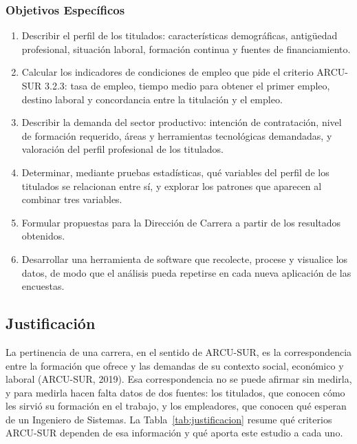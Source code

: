 \documentclass[12pt, a4paper]{article}
\begin{document}
\subsubsection{Objetivos Específicos}

\begin{enumerate}
  \item Describir el perfil de los titulados: características
  demográficas, antigüedad profesional, situación laboral, formación
  continua y fuentes de financiamiento.
  \item Calcular los indicadores de condiciones de empleo que pide el
  criterio ARCU-SUR 3.2.3: tasa de empleo, tiempo medio para obtener el
  primer empleo, destino laboral y concordancia entre la titulación y el
  empleo.
  \item Describir la demanda del sector productivo: intención de
  contratación, nivel de formación requerido, áreas y herramientas
  tecnológicas demandadas, y valoración del perfil profesional de los
  titulados.
  \item Determinar, mediante pruebas estadísticas, qué variables del
  perfil de los titulados se relacionan entre sí, y explorar los
  patrones que aparecen al combinar tres variables.
  \item Formular propuestas para la Dirección de Carrera a partir de los
  resultados obtenidos.
  \item Desarrollar una herramienta de software que recolecte, procese y
  visualice los datos, de modo que el análisis pueda repetirse en cada
  nueva aplicación de las encuestas.
\end{enumerate}

\subsection{Justificación}

La pertinencia de una carrera, en el sentido de ARCU-SUR, es la
correspondencia entre la formación que ofrece y las demandas de su
contexto social, económico y laboral (ARCU-SUR, 2019). Esa
correspondencia no se puede afirmar sin medirla, y para medirla hacen
falta datos de dos fuentes: los titulados, que conocen cómo les sirvió su
formación en el trabajo, y los empleadores, que conocen qué esperan de un
Ingeniero de Sistemas. La Tabla~\ref{tab:justificacion} resume qué
criterios ARCU-SUR dependen de esa información y qué aporta este estudio
a cada uno.
\end{document}
